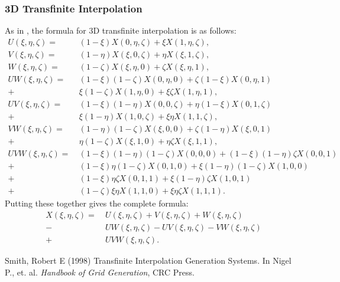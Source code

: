 \documentclass{article}
\newcommand{\ba}[1]{\begin{align*}    #1    \end{align*}}
\begin{document}
\subsubsection{3D Transfinite Interpolation}
As in \cite{smith}, the formula for 3D transfinite interpolation is as follows:
\ba{
U(\xi, \eta, \zeta) = & \ (1-\xi)X(0,\eta, \zeta) + \xi X(1,\eta, \zeta), \\
V(\xi, \eta, \zeta) = & \ (1-\eta)X(\xi, 0, \zeta) + \eta X(\xi, 1, \zeta), \\
W(\xi, \eta, \zeta) = & \ (1-\zeta)X(\xi, \eta, 0) + \zeta X(\xi, \eta, 1), \\
UW(\xi, \eta, \zeta) = & \ (1-\xi)(1-\zeta) X(0, \eta, 0) + \zeta (1-\xi) X(0, \eta, 1)  \\
+ & \ \xi (1-\zeta) X(1,\eta, 0) + \xi \zeta X(1, \eta, 1), \\
UV(\xi, \eta, \zeta) = & \ (1-\xi)(1-\eta)X(0,0,\zeta) + \eta (1-\xi) X(0,1,\zeta)  \\
+ & \ \xi (1-\eta) X(1,0,\zeta) + \xi \eta X(1,1,\zeta), \\
VW(\xi, \eta, \zeta) = & \ (1-\eta)(1-\zeta)X(\xi,0,0) + \zeta (1-\eta) X(\xi, 0, 1)  \\
+ & \ \eta (1-\zeta) X(\xi, 1, 0) + \eta \zeta X(\xi, 1,1),  \\
UVW(\xi, \eta, \zeta) = & \ (1-\xi)(1-\eta)(1-\zeta)X(0,0,0) + (1-\xi)(1-\eta) \zeta X(0,0,1)  \\
+ & \ (1-\xi) \eta (1-\zeta) X(0,1,0) + \xi (1-\eta)(1- \zeta) X(1,0,0) \\
+ & \ (1-\xi) \eta \zeta X(0,1,1) + \xi (1-\eta) \zeta X(1,0,1) \\
+ & \ (1-\zeta) \xi \eta  X(1,1,0) + \xi \eta \zeta  X(1,1,1).
}
Putting these together gives the complete formula:
\ba{
X(\xi, \eta, \zeta) = & \  U(\xi, \eta, \zeta) + V(\xi, \eta, \zeta) + W(\xi, \eta, \zeta) \\
 - & \ UW(\xi, \eta, \zeta) - UV(\xi, \eta, \zeta) - VW(\xi, \eta, \zeta) \\
 + & \  UVW(\xi, \eta, \zeta).
}


\begin{thebibliography}{}
 Smith, Robert E (1998) Transfinite Interpolation Generation Systems. In Nigel P., et. al. {\it Handbook of Grid Generation}, CRC Press.
\end{thebibliography}
\end{document}
